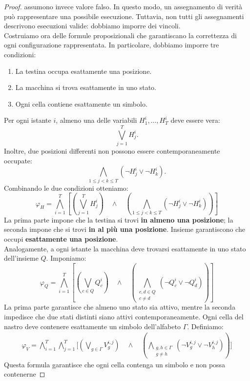 \begin{proof}
assumono invece valore falso.
In questo modo, un assegnamento di verità
può rappresentare una possibile esecuzione.
Tuttavia, non tutti gli assegnamenti descrivono
esecuzioni valide: dobbiamo imporre dei vincoli.\smallskip\\
Costruiamo ora delle formule proposizionali
che garantiscano la correttezza di ogni
configurazione rappresentata.
In particolare, dobbiamo imporre tre condizioni:
\begin{enumerate}
    \item La testina occupa esattamente una posizione.
    \item La macchina si trova esattamente in uno stato.
    \item Ogni cella contiene esattamente un simbolo.
\end{enumerate}
Per ogni istante $i$, almeno una delle variabili
$H_1^i,\ldots,H_T^i$ deve essere vera:
\[
\bigvee_{j=1}^{T}H_j^i.
\]
Inoltre, due posizioni differenti non possono
essere contemporaneamente occupate:
\[
\bigwedge_{1\le j<k\le T}
(\neg H_j^i\lor\neg H_k^i).
\]
Combinando le due condizioni otteniamo:
\[
\boxed{
\varphi_H=
\bigwedge_{i=1}^{T}
\left[
\left(\bigvee_{j=1}^{T}H_j^i\right)
\quad
\land
\quad
\left(
\bigwedge_{1\le j<k\le T}
(\neg H_j^i\lor\neg H_k^i)
\right)
\right]
}
\]
La prima parte impone che la testina si trovi
\textbf{in almeno una posizione}; la seconda
impone che si trovi \textbf{in al più una posizione}.
Insieme garantiscono che occupi
\textbf{esattamente una posizione}.\smallskip\\
Analogamente, a ogni istante la macchina deve
trovarsi esattamente in uno stato dell'insieme $Q$.
Imponiamo:
\[
\boxed{
\varphi_Q=
\bigwedge_{i=1}^{T}
\left[
\left(\bigvee_{c\in Q}Q_c^i\right)
\quad
\land
\quad
\left(
\bigwedge_{\substack{c,d\in Q\\c\ne d}}
(\neg Q_c^i\lor\neg Q_d^i)
\right)
\right]
}
\]
La prima parte garantisce che almeno uno stato
sia attivo, mentre la seconda impedisce
che due stati distinti siano attivi
contemporaneamente.
Ogni cella del nastro deve contenere esattamente
un simbolo dell'alfabeto $\Gamma$.
Definiamo:
\[
\boxed{
\begin{aligned}
\varphi_V=
\bigwedge_{i=1}^{T}
\bigwedge_{j=1}^{T}
\Bigg[
\left(\bigvee_{g\in\Gamma}V_g^{i,j}\right)\quad
\land
\quad
\left(
\bigwedge_{\substack{g,h\in\Gamma\\g\ne h}}
(\neg V_g^{i,j}\lor\neg V_h^{i,j})
\right)
\Bigg]
\end{aligned}
}
\]
Questa formula garantisce che ogni cella
contenga un simbolo e non possa contenerne

\end{proof}
